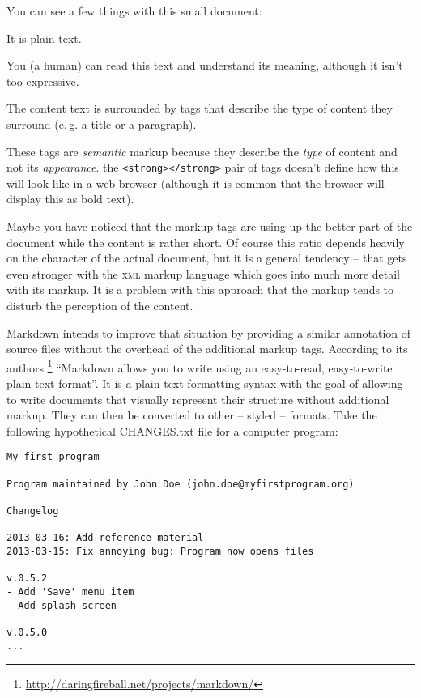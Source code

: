 \documentclass[../../LilyPond-Tutorials]{subfiles}
\begin{document}
You can see a few things with this small document:
\begin{itemize*}
    \item It is plain text.
    \item You (a human) can read this text and understand its meaning, although it isn't too expressive.
    \item The content text is surrounded by tags that describe the type of content they surround (e.\,g. a title or a paragraph).
    \item These tags are \emph{semantic} markup because they describe the \emph{type} of content and not its \emph{appearance}.
    the \texttt{<strong></strong>} pair of tags doesn't define how this will look like in a web browser (although it is common that the browser will display this as bold text).
\end{itemize*}

Maybe you have noticed that the markup tags are using up the better part of the document while the content is rather short.
Of course this ratio depends heavily on the character of the actual document, but it is a general tendency -- that gets even stronger with the \textsc{xml} markup language which goes into much more detail with its markup.
It is a problem with this approach that the markup tends to disturb the perception of the content.

Markdown intends to improve that situation by providing a similar annotation of source files without the overhead of the additional markup tags.
According to its authors%
\footnote{\url{http://daringfireball.net/projects/markdown/}}
“Markdown allows you to write using an easy-to-read, easy-to-write plain text format”.
It is a plain text formatting syntax with the goal of allowing to write documents that visually represent their structure without additional markup.
They can then be converted to other -- styled -- formats.
Take the following hypothetical CHANGES.txt file for a computer program:
\begin{lstlisting}[frame=single]
My first program

Program maintained by John Doe (john.doe@myfirstprogram.org)

Changelog

2013-03-16: Add reference material
2013-03-15: Fix annoying bug: Program now opens files

v.0.5.2
- Add 'Save' menu item
- Add splash screen

v.0.5.0
...
\end{lstlisting}
\end{document}
